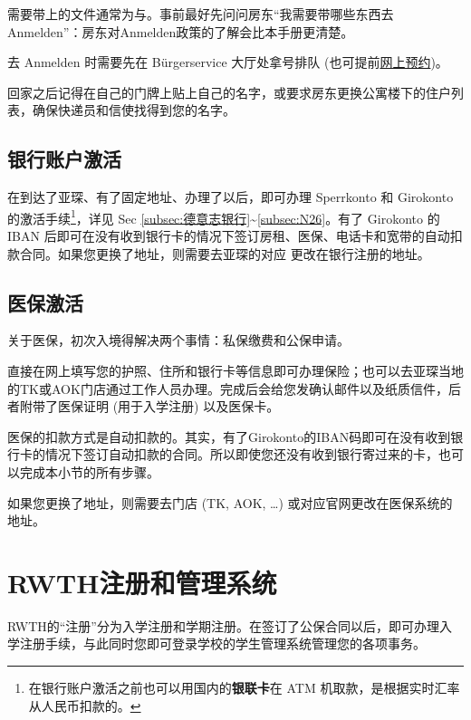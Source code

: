     需要带上的文件通常为与。事前最好先问问房东``我需要带哪些东西去Anmelden''：房东对Anmelden政策的了解会比本手册更清楚。

    去 Anmelden 时需要先在 Bürgerservice 大厅处拿号排队 (也可提前\href{https://www.qtermin.de/bahnhofplatzkatschhof}{网上预约})。

    回家之后记得在自己的门牌上贴上自己的名字，或要求房东更换公寓楼下的住户列表，确保快递员和信使找得到您的名字。

  \subsection{银行账户激活}\label{subsec:银行账户激活}

    在到达了亚琛、有了固定地址、办理了以后，即可办理 Sperrkonto 和 Girokonto 的激活手续\footnote{在银行账户激活之前也可以用国内的\textbf{银联卡}在 ATM 机取款，是根据实时汇率从人民币扣款的。}，详见 Sec \ref{subsec:德意志银行}\textasciitilde\ref{subsec:N26}。有了 Girokonto 的 IBAN 后即可在没有收到银行卡的情况下签订房租、医保、电话卡和宽带的自动扣款合同。如果您更换了地址，则需要去亚琛的对应 更改在银行注册的地址。

  \subsection{医保激活}\label{subsec:医保激活}

    关于医保，初次入境得解决两个事情：私保缴费和公保申请。

    直接在网上填写您的护照、住所和银行卡等信息即可办理保险；也可以去亚琛当地的TK或AOK门店通过工作人员办理。完成后会给您发确认邮件以及纸质信件，后者附带了医保证明 (用于入学注册) 以及医保卡。

    医保的扣款方式是自动扣款的。其实，有了Girokonto的IBAN码即可在没有收到银行卡的情况下签订自动扣款的合同。所以即使您还没有收到银行寄过来的卡，也可以完成本小节的所有步骤。

    如果您更换了地址，则需要去门店 (TK, AOK, …) 或对应官网更改在医保系统的地址。

\section{RWTH注册和管理系统}\label{sec:RWTH注册和管理系统}

  RWTH的``注册''分为入学注册和学期注册。在签订了公保合同以后，即可办理入学注册手续，与此同时您即可登录学校的学生管理系统管理您的各项事务。

